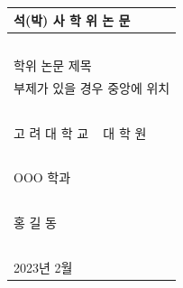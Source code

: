 \documentclass{report}
\begin{document}

\newpage
\noindent
\begin{tabularx}{\textwidth}{| >{\centering\arraybackslash}X |}
\arrayrulecolor{lgray}
\hline
\Large 석(박) 사 학 위 논 문 \\\hline
~\vspace{70pt}\\\hline %
\huge 학위 논문 제목\\ %
\Large 부제가 있을 경우 중앙에 위치\\
~\vspace{14pt}\\\hline %
\LARGE 고 려 대 학 교 ~ 대 학 원\\\hline %
~\\\hline
\Large OOO 학과 \\\hline %
~\\\hline
\Large 홍 길 동 \\\hline %
~\\\hline %
\large 2023년 2월 \\\hline %
\end{tabularx}

\newpage
~
%
\end{document}
